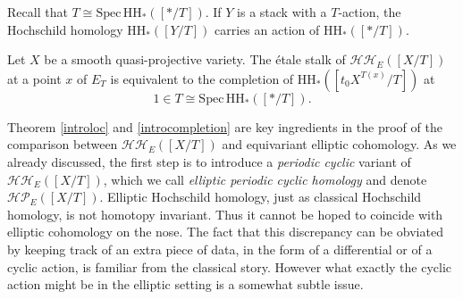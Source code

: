 \documentclass[11pt,letterpaper]{amsart}
\newenvironment{customthm}[1]
{\renewcommand\theinnercustomthm{#1}\innercustomthm}
  {\endinnercustomthm}
\newcommand{\Spec}{\mathrm{S}\mathrm{pec}\,}
\begin{document}
Recall that $T\cong \Spec \mathrm{HH}_\ast([\ast/T])$. If $Y$ is a stack with a $T$-action, the Hochschild homology $
\mathrm{HH}_\ast([Y/T])$ carries an action of 
$\mathrm{HH}_\ast([\ast/T])$. 

\begin{customthm}{F}[Theorem \ref{theorem:completionsgeneral}]
\label{introcompletion}
Let $X$ be a smooth quasi-projective variety. The \'etale stalk of $\mathcal{HH}_E([X/T])$ at a point $x$ of $E_T$  is equivalent to the  completion of $\mathrm{HH}_\ast([t_0 X^{T(x)}/T])$ at  $$1\in T\cong \Spec \mathrm{HH}_\ast([\ast/T]).$$
\end{customthm}
 
Theorem \ref{introloc} and \ref{introcompletion} are key ingredients in the proof of the comparison between $\mathcal{HH}_E([X/T])$ and  equivariant elliptic cohomology. As we already discussed, the first step is   to introduce a \emph{periodic cyclic} variant of  $\mathcal{HH}_E([X/T])$, which we call  \emph{elliptic periodic cyclic homology} and denote  $\mathcal{HP}_E([X/T])$. Elliptic Hochschild homology, just as classical Hochschild homology, is  not homotopy invariant. Thus it cannot be hoped to coincide with elliptic cohomology on the nose. The fact that this discrepancy can be obviated by keeping track of an extra piece of data, in the form of a differential or of a cyclic action, is familiar from the classical story. However what exactly the  cyclic action might be in the elliptic setting is a somewhat  subtle issue. 
\end{document}
